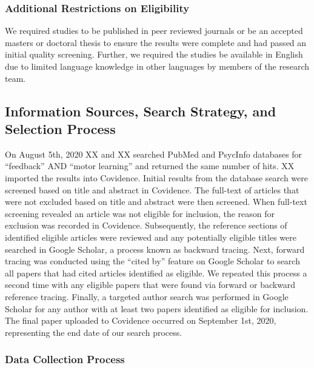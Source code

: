 \documentclass[
  english,
  man, donotrepeattitle,floatsintext]{apa7}
\begin{document}
\hypertarget{additional-restrictions-on-eligibility}{%
\subsubsection{Additional Restrictions on Eligibility}\label{additional-restrictions-on-eligibility}}

We required studies to be published in peer reviewed journals or be an accepted masters or doctoral thesis to ensure the results were complete and had passed an initial quality screening. Further, we required the studies be available in English due to limited language knowledge in other languages by members of the research team.

\hypertarget{information-sources-search-strategy-and-selection-process}{%
\subsection{Information Sources, Search Strategy, and Selection Process}\label{information-sources-search-strategy-and-selection-process}}

On August 5th, 2020 XX and XX searched PubMed and PsycInfo databases for ``feedback'' AND ``motor learning'' and returned the same number of hits. XX imported the results into Covidence. Initial results from the database search were screened based on title and abstract in Covidence. The full-text of articles that were not excluded based on title and abstract were then screened. When full-text screening revealed an article was not eligible for inclusion, the reason for exclusion was recorded in Covidence. Subsequently, the reference sections of identified eligible articles were reviewed and any potentially eligible titles were searched in Google Scholar, a process known as backward tracing. Next, forward tracing was conducted using the ``cited by'' feature on Google Scholar to search all papers that had cited articles identified as eligible. We repeated this process a second time with any eligible papers that were found via forward or backward reference tracing. Finally, a targeted author search was performed in Google Scholar for any author with at least two papers identified as eligible for inclusion. The final paper uploaded to Covidence occurred on September 1st, 2020, representing the end date of our search process.

\hypertarget{data-collection-process}{%
\subsubsection{Data Collection Process}\label{data-collection-process}}
\end{document}
